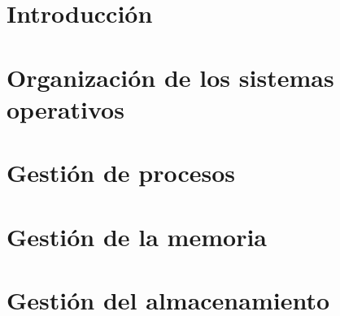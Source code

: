 \documentclass[12pt,a4paper]{book}
\begin{document}
\frontmatter

\tableofcontents

\mainmatter

\part{Introducci\'{o}n}





\part{Organizaci\'{o}n de los sistemas operativos}







\part{Gesti\'{o}n de procesos}








\part{Gesti\'{o}n de la memoria}





\part{Gesti\'{o}n del almacenamiento}





\backmatter
\printindex
\end{document}
